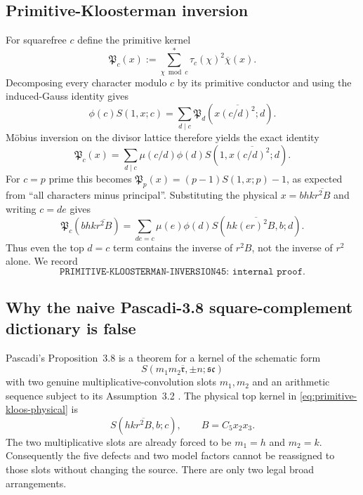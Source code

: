 \documentclass[11pt]{article}
\theoremstyle{definition}
\newcommand{\1}{\mathbf 1}
\begin{document}
\subsection{Primitive-Kloosterman inversion}

For squarefree $c$ define the primitive kernel
\[
 \mathfrak P_c(x):=
 \sum_{\chi\bmod c}^{*}\tau_c(\chi)^2\overline\chi(x).
\]
Decomposing every character modulo $c$ by its primitive conductor and using
the induced-Gauss identity gives
\[
 \phi(c)S(1,x;c)
 =\sum_{d\mid c}
   \mathfrak P_d\!\left(x\overline{(c/d)^2};d\right).
\]
M\"obius inversion on the divisor lattice therefore yields the exact identity
\begin{equation}
 \boxed{
 \mathfrak P_c(x)
 =\sum_{d\mid c}\mu(c/d)\phi(d)
 S\!\left(1,x\overline{(c/d)^2};d\right).
 }
 \label{eq:primitive-kloos-inversion}
\end{equation}
For $c=p$ prime this becomes
$\mathfrak P_p(x)=(p-1)S(1,x;p)-1$, as expected from ``all characters minus
principal''.  Substituting the physical
$x=bhk\overline{r^2B}$ and writing $c=de$ gives
\begin{equation}
 \boxed{
 \mathfrak P_c\!\left(bhk\overline{r^2B}\right)
 =\sum_{de=c}\mu(e)\phi(d)
 S\!\left(hk\overline{(er)^2B},b;d\right).
 }
 \label{eq:primitive-kloos-physical}
\end{equation}
Thus even the top $d=c$ term contains the inverse of $r^2B$, not the inverse
of $r^2$ alone.  We record
\[
 \boxed{\texttt{PRIMITIVE-KLOOSTERMAN-INVERSION45: internal proof}.}
\]

\subsection{Why the naive Pascadi-3.8 square-complement dictionary is false}

Pascadi's Proposition~3.8 is a theorem for a kernel of the schematic form
\[
 S(m_1m_2\overline{\mathfrak r},\pm n;\mathfrak s\mathfrak c)
\]
with two genuine multiplicative-convolution slots $m_1,m_2$ and an arithmetic
sequence subject to its Assumption~3.2 \cite{PascadiDistribution2025}.  The physical top
kernel in \eqref{eq:primitive-kloos-physical} is
\[
 \boxed{S(hk\overline{r^2B},b;c),\qquad B=C_5x_2x_3.}
\]
The two multiplicative slots are already forced to be $m_1=h$ and $m_2=k$.
Consequently the five defects and two model factors cannot be reassigned to
those slots without changing the source.  There are only two legal broad
arrangements.
\end{document}
